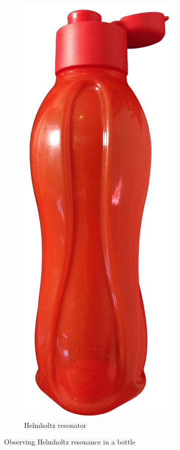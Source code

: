 \documentclass[10pt]{article}
\begin{document}
\begin{figure}[ht]
\begin{subfigure}[b]{0.48\textwidth}
        \includegraphics[scale=0.15]{bottle.png}
        \caption{Helmholtz resonator}
    \end{subfigure}
    \caption{Observing Helmholtz resonance in a bottle\vspace{-0.5cm}}
    \label{helmholtz_resonance}
\end{figure}
\end{document}
